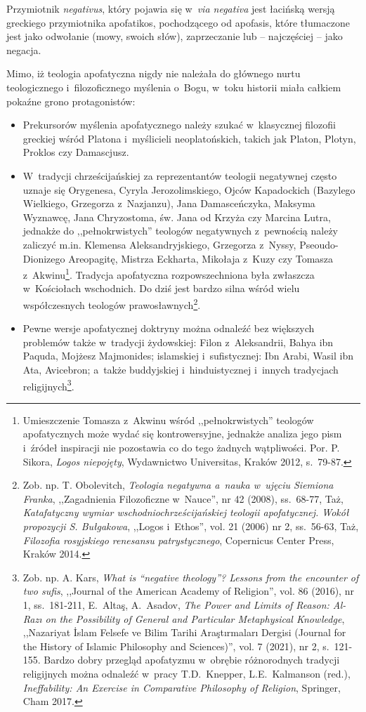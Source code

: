 Przymiotnik \textit{negativus}, który pojawia się w~\textit{via negativa} jest łacińską wersją greckiego przymiotnika \textgreek{apofatikos}, pochodzącego od \textgreek{apofasis}, które tłumaczone jest jako odwołanie (mowy, swoich słów), zaprzeczanie lub -- najczęściej -- jako negacja.

Mimo, iż teologia apofatyczna nigdy nie należała do głównego nurtu teologicznego i~filozoficznego myślenia o~Bogu, w~toku historii miała całkiem pokaźne grono protagonistów:

\begin{itemize}
\item Prekursorów myślenia apofatycznego należy szukać w~klasycznej filozofii greckiej wśród Platona i~myślicieli neoplatońskich, takich jak Platon, Plotyn, Proklos czy Damascjusz.
\item W~tradycji chrześcijańskiej za reprezentantów teologii negatywnej często uznaje się Orygenesa, Cyryla Jerozolimskiego, Ojców Kapadockich (Bazylego Wielkiego, Grzegorza z~Nazjanzu), Jana Damasceńczyka, Maksyma Wyznawcę, Jana Chryzostoma, św. Jana od Krzyża czy Marcina Lutra, jednakże do ,,pełnokrwistych'' teologów negatywnych z~pewnością należy zaliczyć m.in. Klemensa Aleksandryjskiego, Grzegorza z~Nyssy, Pseoudo-Dionizego Areopagitę, Mistrza Eckharta, Mikołaja z~Kuzy czy Tomasza z~Akwinu\footnote{Umieszczenie Tomasza z~Akwinu wśród ,,pełnokrwistych'' teologów apofatycznych może wydać się kontrowersyjne, jednakże analiza jego pism i~źródeł inspiracji nie pozostawia co do tego żadnych wątpliwości. Por. P. Sikora, \textit{Logos niepojęty}, Wydawnictwo Universitas, Kraków 2012, s.~79-87.}. Tradycja apofatyczna rozpowszechniona była zwłaszcza w~Kościołach wschodnich. Do dziś jest bardzo silna wśród wielu współczesnych teologów prawosławnych\footnote{Zob. np. T. Obolevitch, \textit{Teologia negatywna a~nauka w~ujęciu Siemiona Franka}, ,,Zagadnienia Filozoficzne w~Nauce'', nr 42 (2008), ss.~68-77, Taż, \textit{Katafatyczny wymiar wschodniochrześcijańskiej teologii apofatycznej. Wokół propozycji S. Bułgakowa}, ,,Logos i~Ethos'', vol. 21 (2006) nr 2, ss.~56-63, Taż, \textit{Filozofia rosyjskiego renesansu patrystycznego}, Copernicus Center Press, Kraków 2014.}.
\item Pewne wersje apofatycznej doktryny można odnaleźć bez większych problemów także w~tradycji żydowskiej: Filon z~Aleksandrii, Bahya ibn Paquda, Mojżesz Majmonides; islamskiej i~sufistycznej: Ibn Arabi, Wasil ibn Ata, Avicebron; a~także buddyjskiej i~hinduistycznej i~innych tradycjach religijnych\footnote{Zob. np. A. Kars, \textit{What is ``negative theology''? Lessons from the encounter of two sufis}, ,,Journal of the American Academy of Religion'', vol. 86 (2016), nr 1, ss.~181-211, E.~Altaş, A.~Asadov, \textit{The Power and Limits of Reason: Al-Razı on the Possibility of General and Particular Metaphysical Knowledge}, ,,Nazariyat İslam Felsefe ve Bilim Tarihi Araştırmaları Dergisi (Journal for the History of Islamic Philosophy and Sciences)'', vol. 7 (2021), nr 2, s.~121-155. Bardzo dobry przegląd apofatyzmu w~obrębie różnorodnych tradycji religijnych można odnaleźć w~pracy T.D.~Knepper, L.E.~Kalmanson (red.), \textit{Ineffability: An Exercise in Comparative Philosophy of Religion}, Springer, Cham 2017.}.
\end{itemize}
